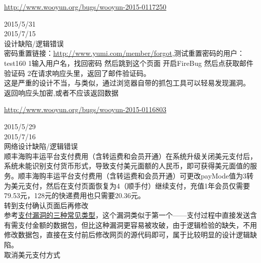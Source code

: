 \documentclass{leptc}
\begin{document}
\begin{center}
	\url{http://www.wooyun.org/bugs/wooyun-2015-0117250}
\end{center}
 2015/5/31 \\
 2015/7/15 \\
 设计缺陷/逻辑错误 \\
 密码重置链接：\url{http://www.yumi.com/member/forgot},测试重置密码的用户：test160 \N1输入用户名，找回密码 然后跳到这个页面 开启FireBug 然后点获取邮件验证码 \N2在请求响应头里，返回了邮件验证码。 \\
 这是严重的设计不当，与类似，通过浏览器自带的抓包工具可以轻易发现漏洞。\\
 返回响应头加密,或者不应该返回数据\\

\begin{center}
	\url{http://www.wooyun.org/bugs/wooyun-2015-0116803}
\end{center}
 2015/5/29 \\
 2015/7/16 \\
 网络设计缺陷/逻辑错误 \\
 顺丰海购丰运平台支付费用（含转运费和会员开通）在系统升级关闭美元支付后，系统未能识别支付货币形式，导致支付美元面额的人民币，即可获得美元面值的服务。顺丰海购丰运平台支付费用（含转运费和会员开通）可更改payMode值为3转为美元支付，然后在支付页面恢复为4（顺手付）继续支付，充值1年会员仅需要79.53元，128元的快递费用也只需要20.36元。
\\
转到支付确认页面后再修改
\\
 参考\href{http://zone.wooyun.org/content/878}{支付漏洞的三种常见类型}，这个漏洞类似于第一个——支付过程中直接发送含有需支付金额的数据包，但比这种漏洞更容易被攻破，由于逻辑检验的缺失，不用修改数据包，直接在支付前后修改网页的源代码即可，属于比较明显的设计逻辑缺陷。\\
 取消美元支付方式\\
\end{document}
